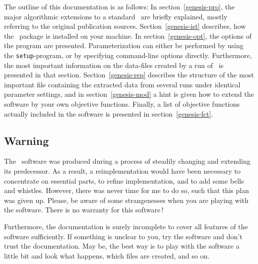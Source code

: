 The outline of this documentation is as follows:
In section~\ref{genesis-pro}, the major algorithmic extensions to a standard
\GA\ are briefly explained, mostly referring to the original 
publication sources.
Section~\ref{genesis-ist} describes, how the \GEN\ package is installed 
on your machine.
In section~\ref{genesis-opt}, the options of the program are presented.
Parameterization can either be performed by using the {\tt setup}-program,
or by specifying command-line options directly.
Furthermore, the most important information on the data-files created by
a run of \GEN\ is presented in that section.
Section~\ref{genesis-rep} describes the structure of the most important
file containing the extracted data from several runs under identical
parameter settings,  and in section~\ref{genesis-mod}
a hint is given how to extend the software by your own objective functions.
Finally, a list of objective functions actually included in the software
is presented in section~\ref{genesis-fct}.

\subsection{Warning}

\begin{sc}
The \GEN\ software was produced during a process of steadily changing and
extending its predecessor.
As a result, a reimplementation would have been necessary to concentrate
on essential parts, to refine implementation, and to add some bells and
whistles.
However, there was never time for me to do so, such that this plan 
was given up.
Please, be aware of some strangenesses when you are playing with the
software.
There is no warranty for this software\,!

Furthermore, the documentation is surely incomplete to cover all features
of the software sufficiently.
If something is unclear to you, try the software and don't trust the
documentation.
May be, the best way is to play with the software a little bit and look
what happens, which files are created, and so on.
\end{sc}

